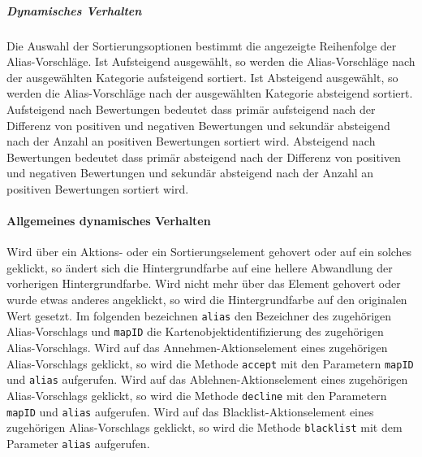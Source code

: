 \subparagraph*{Dynamisches Verhalten}
Die Auswahl der Sortierungsoptionen bestimmt die angezeigte Reihenfolge der Alias-Vorschläge.
Ist \dq Aufsteigend \dq{} ausgewählt, so werden die Alias-Vorschläge nach der ausgewählten Kategorie aufsteigend sortiert.
Ist \dq Absteigend \dq{} ausgewählt, so werden die Alias-Vorschläge nach der ausgewählten Kategorie absteigend sortiert.
Aufsteigend nach Bewertungen bedeutet dass primär aufsteigend nach der Differenz von positiven und negativen Bewertungen und sekundär absteigend nach der Anzahl an positiven Bewertungen sortiert wird.
Absteigend nach Bewertungen bedeutet dass primär absteigend nach der Differenz von positiven und negativen Bewertungen und sekundär absteigend nach der Anzahl an positiven Bewertungen sortiert wird.

\paragraph*{Allgemeines dynamisches Verhalten}
Wird über ein Aktions- oder ein Sortierungselement gehovert oder auf ein solches geklickt, so ändert sich die Hintergrundfarbe auf eine hellere Abwandlung der vorherigen Hintergrundfarbe.
Wird nicht mehr über das Element gehovert oder wurde etwas anderes angeklickt, so wird die Hintergrundfarbe auf den originalen Wert gesetzt.
Im folgenden bezeichnen \verb#alias# den Bezeichner des zugehörigen Alias-Vorschlags und \verb#mapID# die Kartenobjektidentifizierung des zugehörigen Alias-Vorschlags.
Wird auf das Annehmen-Aktionselement eines zugehörigen Alias-Vorschlags geklickt, so wird die Methode \verb#accept# mit den Parametern \verb#mapID# und \verb#alias# aufgerufen. 
Wird auf das Ablehnen-Aktionselement eines zugehörigen Alias-Vorschlags geklickt, so wird die Methode \verb#decline# mit den Parametern \verb#mapID# und \verb#alias# aufgerufen. 
Wird auf das Blacklist-Aktionselement eines zugehörigen Alias-Vorschlags geklickt, so wird die Methode \verb#blacklist# mit dem Parameter \verb#alias# aufgerufen. 